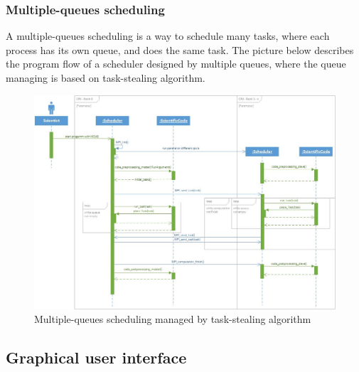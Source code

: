 \subsubsection{Multiple-queues scheduling}	
\vspace{0.5cm}
A multiple-queues scheduling is a way to schedule many tasks, where each process has its own queue, and does the same task. The picture below describes the program flow of a scheduler designed by multiple queues, where the queue managing is based on task-stealing algorithm.
\vspace{1cm}
	\begin{figure}[H]
	\centering
	\includegraphics[width=15cm]{images/Task-stealing.jpg}
	\caption{Multiple-queues scheduling managed by task-stealing algorithm}
	\end{figure}
\newpage
	
\subsection{Graphical user interface}
